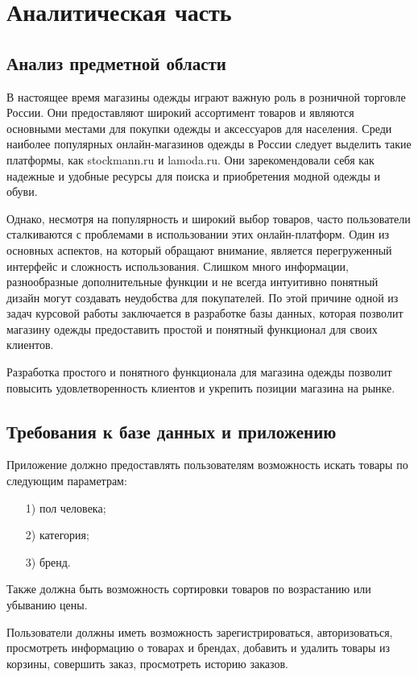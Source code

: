 \documentclass{bmstu}
\begin{document}
\chapter{Аналитическая часть}

\section{Анализ предметной области}

В настоящее время магазины одежды играют важную роль в розничной торговле России. Они предоставляют широкий ассортимент товаров и являются основными местами для покупки одежды и аксессуаров для населения. Среди наиболее популярных онлайн-магазинов одежды в России следует выделить такие платформы, как stockmann.ru и lamoda.ru. Они зарекомендовали себя как надежные и удобные ресурсы для поиска и приобретения модной одежды и обуви.

Однако, несмотря на популярность и широкий выбор товаров, часто пользователи сталкиваются с проблемами в использовании этих онлайн-платформ. Один из основных аспектов, на который обращают внимание, является перегруженный интерфейс и сложность использования. Слишком много информации, разнообразные дополнительные функции и не всегда интуитивно понятный дизайн могут создавать неудобства для покупателей. По этой причине одной из задач курсовой работы заключается в разработке базы данных, которая позволит магазину одежды предоставить простой и понятный функционал для своих клиентов.

Разработка простого и понятного функционала для магазина одежды позволит повысить удовлетворенность клиентов и укрепить позиции магазина на рынке.

\section{Требования к базе данных и приложению}

Приложение должно предоставлять пользователям возможность искать товары по следующим параметрам:
\begin{enumerate}
	\item[1)] пол человека;
	\item[2)] категория;
	\item[3)] бренд.
\end{enumerate}

Также должна быть возможность сортировки товаров по возрастанию или убыванию цены.

Пользователи должны иметь возможность зарегистрироваться, авторизоваться, просмотреть информацию о товарах и брендах, добавить и удалить товары из корзины, совершить заказ, просмотреть историю заказов.
\end{document}
